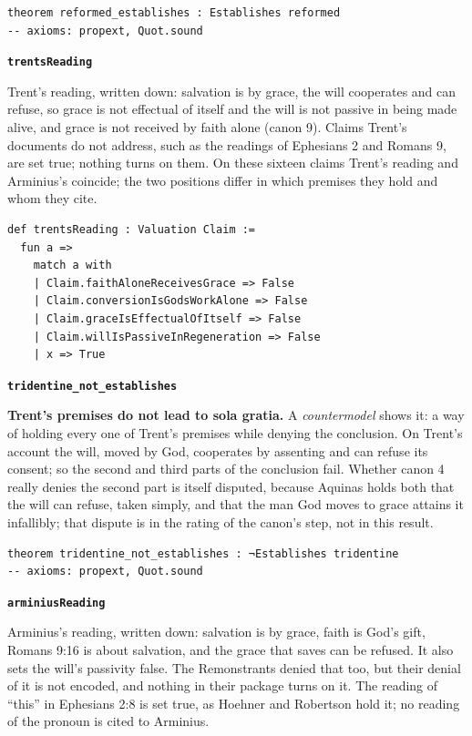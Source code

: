 \documentclass[11pt]{article}
\begin{document}
{\small\begin{verbatim}
theorem reformed_establishes : Establishes reformed
-- axioms: propext, Quot.sound
\end{verbatim}}
\par\medskip\noindent\textbf{\texttt{trents\allowbreak{}Reading}}\par\nobreak\noindent
Trent’s reading, written down: salvation is by grace, the will cooperates and can refuse, so grace is not effectual of itself and the will is not passive in being made alive, and grace is not received by faith alone (canon 9). Claims Trent’s documents do not address, such as the readings of Ephesians 2 and Romans 9, are set true; nothing turns on them. On these sixteen claims Trent’s reading and Arminius’s coincide; the two positions differ in which premises they hold and whom they cite.

{\small\begin{verbatim}
def trentsReading : Valuation Claim :=
  fun a =>
    match a with
    | Claim.faithAloneReceivesGrace => False
    | Claim.conversionIsGodsWorkAlone => False
    | Claim.graceIsEffectualOfItself => False
    | Claim.willIsPassiveInRegeneration => False
    | x => True
\end{verbatim}}
\par\medskip\noindent\textbf{\texttt{tridentine\_\allowbreak{}not\_\allowbreak{}establishes}}\par\nobreak\noindent
\textbf{Trent’s premises do not lead to sola gratia.} A \emph{countermodel} shows it: a way of holding every one of Trent’s premises while denying the conclusion. On Trent’s account the will, moved by God, cooperates by assenting and can refuse its consent; so the second and third parts of the conclusion fail. Whether canon 4 really denies the second part is itself disputed, because Aquinas holds both that the will can refuse, taken simply, and that the man God moves to grace attains it infallibly; that dispute is in the rating of the canon’s step, not in this result.

{\small\begin{verbatim}
theorem tridentine_not_establishes : ¬Establishes tridentine
-- axioms: propext, Quot.sound
\end{verbatim}}
\par\medskip\noindent\textbf{\texttt{arminius\allowbreak{}Reading}}\par\nobreak\noindent
Arminius’s reading, written down: salvation is by grace, faith is God’s gift, Romans 9:16 is about salvation, and the grace that saves can be refused. It also sets the will’s passivity false. The Remonstrants denied that too, but their denial of it is not encoded, and nothing in their package turns on it. The reading of “this” in Ephesians 2:8 is set true, as Hoehner and Robertson hold it; no reading of the pronoun is cited to Arminius.
\end{document}
